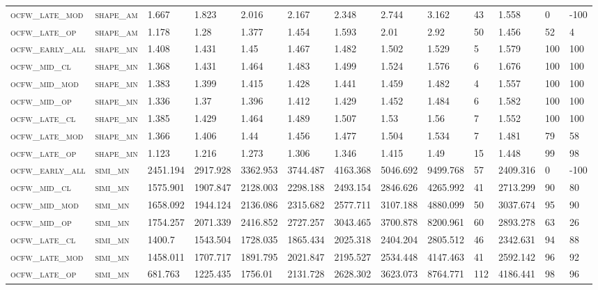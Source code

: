 \begin{landscape}
\begin{center}
\begin{footnotesize}
\begin{longtable}{lllllllllllll}
\textsc{ocfw\_late\_mod } & \textsc{shape\_am }   & 1.667    & 1.823    & 2.016    & 2.167    & 2.348    & 2.744    & 3.162    & 43  & 1.558    & 0   & -100 \\
\textsc{ocfw\_late\_op  } & \textsc{shape\_am }   & 1.178    & 1.28     & 1.377    & 1.454    & 1.593    & 2.01     & 2.92     & 50  & 1.456    & 52  & 4    \\
\textsc{ocfw\_early\_all} & \textsc{shape\_mn }   & 1.408    & 1.431    & 1.45     & 1.467    & 1.482    & 1.502    & 1.529    & 5   & 1.579    & 100 & 100  \\
\textsc{ocfw\_mid\_cl   } & \textsc{shape\_mn }   & 1.368    & 1.431    & 1.464    & 1.483    & 1.499    & 1.524    & 1.576    & 6   & 1.676    & 100 & 100  \\
\textsc{ocfw\_mid\_mod  } & \textsc{shape\_mn }   & 1.383    & 1.399    & 1.415    & 1.428    & 1.441    & 1.459    & 1.482    & 4   & 1.557    & 100 & 100  \\
\textsc{ocfw\_mid\_op   } & \textsc{shape\_mn }   & 1.336    & 1.37     & 1.396    & 1.412    & 1.429    & 1.452    & 1.484    & 6   & 1.582    & 100 & 100  \\
\textsc{ocfw\_late\_cl  } & \textsc{shape\_mn }   & 1.385    & 1.429    & 1.464    & 1.489    & 1.507    & 1.53     & 1.56     & 7   & 1.552    & 100 & 100  \\
\textsc{ocfw\_late\_mod } & \textsc{shape\_mn }   & 1.366    & 1.406    & 1.44     & 1.456    & 1.477    & 1.504    & 1.534    & 7   & 1.481    & 79  & 58   \\
\textsc{ocfw\_late\_op  } & \textsc{shape\_mn }   & 1.123    & 1.216    & 1.273    & 1.306    & 1.346    & 1.415    & 1.49     & 15  & 1.448    & 99  & 98   \\
\textsc{ocfw\_early\_all} & \textsc{simi\_mn  }   & 2451.194 & 2917.928 & 3362.953 & 3744.487 & 4163.368 & 5046.692 & 9499.768 & 57  & 2409.316 & 0   & -100 \\
\textsc{ocfw\_mid\_cl   } & \textsc{simi\_mn  }   & 1575.901 & 1907.847 & 2128.003 & 2298.188 & 2493.154 & 2846.626 & 4265.992 & 41  & 2713.299 & 90  & 80   \\
\textsc{ocfw\_mid\_mod  } & \textsc{simi\_mn  }   & 1658.092 & 1944.124 & 2136.086 & 2315.682 & 2577.711 & 3107.188 & 4880.099 & 50  & 3037.674 & 95  & 90   \\
\textsc{ocfw\_mid\_op   } & \textsc{simi\_mn  }   & 1754.257 & 2071.339 & 2416.852 & 2727.257 & 3043.465 & 3700.878 & 8200.961 & 60  & 2893.278 & 63  & 26   \\
\textsc{ocfw\_late\_cl  } & \textsc{simi\_mn  }   & 1400.7   & 1543.504 & 1728.035 & 1865.434 & 2025.318 & 2404.204 & 2805.512 & 46  & 2342.631 & 94  & 88   \\
\textsc{ocfw\_late\_mod } & \textsc{simi\_mn  }   & 1458.011 & 1707.717 & 1891.795 & 2021.847 & 2195.527 & 2534.448 & 4147.463 & 41  & 2592.142 & 96  & 92   \\
\textsc{ocfw\_late\_op  } & \textsc{simi\_mn  }   & 681.763  & 1225.435 & 1756.01  & 2131.728 & 2628.302 & 3623.073 & 8764.771 & 112 & 4186.441 & 98  & 96  


\end{longtable}
\end{footnotesize}
\end{center}
\end{landscape}
